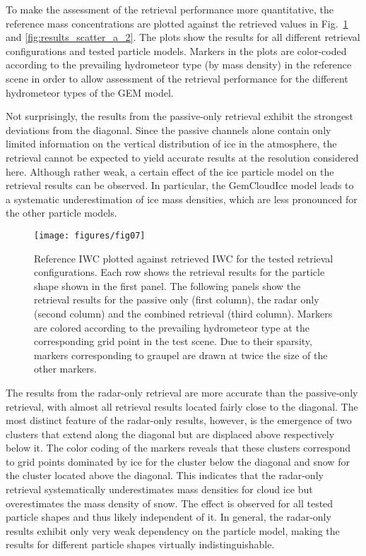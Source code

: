 \documentclass[journal abbreviation, manuscript]{copernicus}
\begin{document}
To make the assessment of the retrieval performance more quantitative, the
reference mass concentrations are plotted against the retrieved values in
Fig.~\ref{fig:results_scatter_a_1} and \ref{fig:results_scatter_a_2}. The plots
show the results for all different retrieval configurations and tested
particle models. Markers in the plots are color-coded according to the
prevailing hydrometeor type (by mass density) in the reference scene in order
to allow assessment of the retrieval performance for the different hydrometeor
types of the GEM model.

Not surprisingly, the results from the passive-only retrieval exhibit the
strongest deviations from the diagonal. Since the passive channels alone contain
only limited information on the vertical distribution of ice in the atmosphere,
the retrieval cannot be expected to yield accurate results at the resolution
considered here. Although rather weak, a certain effect of the ice particle
model on the retrieval results can be observed. In particular, the GemCloudIce model
leads to a systematic underestimation of ice mass densities, which are less
pronounced for the other particle models.

\begin{figure}
\centering \texttt{[image: figures/fig07]}
\caption{Reference IWC plotted against retrieved IWC for the tested retrieval
  configurations. Each row shows the retrieval results for the particle shape
  shown in the first panel. The following panels show the retrieval results for
  the passive only (first column), the radar only (second column) and the
  combined retrieval (third column). Markers are colored according to the
  prevailing hydrometeor type at the corresponding grid point in the test
  scene. Due to their sparsity, markers corresponding to graupel are drawn at
  twice the size of the other markers.}
\label{fig:results_scatter_a_1}
\end{figure}

The results from the radar-only retrieval are more accurate than the
passive-only retrieval, with almost all retrieval results located fairly close
to the diagonal. The most distinct feature of the radar-only results, however,
is the emergence of two clusters that extend along the diagonal but are
displaced above respectively below it. The color coding of the markers reveals
that these clusters correspond to grid points dominated by ice for the cluster
below the diagonal and snow for the cluster located above the diagonal. This
indicates that the radar-only retrieval systematically underestimates mass
densities for cloud ice but overestimates the mass density of snow. The effect
is observed for all tested particle shapes and thus likely independent of it. In
general, the radar-only results exhibit only very weak dependency on the
particle model, making the results for different particle shapes virtually
indistinguishable.
\end{document}
